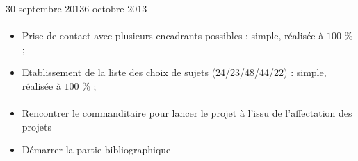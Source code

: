 \documentclass[11pt, french]{report-rd-info}
\begin{document}
\begin{fichesuivi}{30 septembre 2013}{6 octobre 2013}

\paragraph{}
	\begin{travaileffectue}
		\begin{itemize}
			\item Prise de contact avec plusieurs encadrants possibles : simple, réalisée à $100$ \% ;
			\item Etablissement de la liste des choix de sujets (24/23/48/44/22) : simple, réalisée à $100$ \% ;		
		\end{itemize}
	\end{travaileffectue}
	
\paragraph{}
	\begin{planification}
		\begin{itemize}
			\item Rencontrer le commanditaire pour lancer le projet à l'issu de l'affectation des projets
			\item Démarrer la partie bibliographique
		\end{itemize}
	\end{planification}
\end{fichesuivi}
\end{document}
